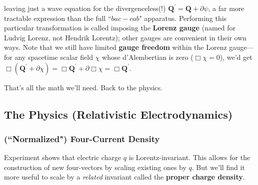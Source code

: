 \documentclass[12pt]{article}
\renewcommand{\vv}[1]{\mathbf{#1}}
\begin{document}
leaving just a wave equation for the divergenceless(!) $\vv Q^\prime = \vv Q + \partialup \psi$, a far more tractable expression than the full ``$bac - cab$" apparatus. Performing this particular transformation is called imposing the \textbf{Lorenz gauge} (named for Ludvig Lorenz, not Hendrik Lorentz); other gauges are convenient in their own ways. Note that we still have limited \textbf{gauge freedom} within the Lorenz gauge---for any spacetime scalar field $\chi$ whose d'Alembertian is zero (${\Box \chi = 0}$), we'd get $\Box ( \vv Q^\prime + \partialup \chi ) = \Box \vv Q^\prime + \partialup \Box \chi = \Box \vv Q^\prime$.

That's all the math we'll need. Back to the physics.



\subsection{The Physics (Relativistic Electrodynamics)}

\subsubsection[("Normalized") Four-Current Density]{(``Normalized") Four-Current Density}\label{sssec:fcd}

Experiment shows that electric charge $q$ is Lorentz-invariant. This allows for the construction of new four-vectors by scaling existing ones by $q$. But we'll find it more useful to scale by a \emph{related} invariant called the \textbf{proper charge density}.
\end{document}
